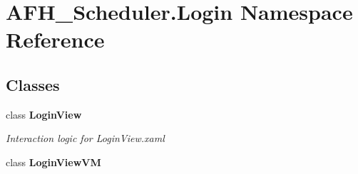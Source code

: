 \section{A\+F\+H\+\_\+\+Scheduler.\+Login Namespace Reference}
\label{namespace_a_f_h___scheduler_1_1_login}
\subsection*{Classes}
\begin{DoxyCompactItemize}
\item 
class \textbf{ Login\+View}
\begin{DoxyCompactList}\small\item\em Interaction logic for Login\+View.\+xaml \end{DoxyCompactList}\item 
class \textbf{ Login\+View\+VM}
\end{DoxyCompactItemize}
